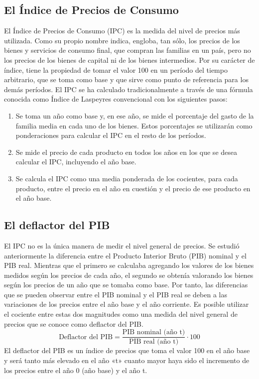 \documentclass[
]{krantz}
\providecommand{\tightlist}{%
  \setlength{\itemsep}{0pt}\setlength{\parskip}{0pt}}
\begin{document}
\hypertarget{el-uxedndice-de-precios-de-consumo}{%
\subsection{El Índice de Precios de Consumo}\label{el-uxedndice-de-precios-de-consumo}}

El Índice de Precios de Consumo (IPC) es la medida del nivel de precios más utilizada. Como su propio nombre indica, engloba, tan sólo, los precios de los bienes y servicios de consumo final, que compran las familias en un país, pero no los precios de los bienes de capital ni de los bienes intermedios. Por su carácter de índice, tiene la propiedad de tomar el valor 100 en un período del tiempo arbitrario, que se toma como base y que sirve como punto de referencia para los demás períodos. El IPC se ha calculado tradicionalmente a través de una fórmula conocida como Índice de Laspeyres convencional con los siguientes pasos:

\begin{enumerate}
\def\labelenumi{\arabic{enumi}.}
\tightlist
\item
  Se toma un año como base y, en ese año, se mide el porcentaje del gasto de la familia media en cada uno de los bienes. Estos porcentajes se utilizarán como ponderaciones para calcular el IPC en el resto de los períodos.
\item
  Se mide el precio de cada producto en todos los años en los que se desea calcular el IPC, incluyendo el año base.
\item
  Se calcula el IPC como una media ponderada de los cocientes, para cada producto, entre el precio en el año en cuestión y el precio de ese producto en el año base.
\end{enumerate}

\hypertarget{el-deflactor-del-pib}{%
\subsection{El deflactor del PIB}\label{el-deflactor-del-pib}}

El IPC no es la única manera de medir el nivel general de precios. Se estudió anteriormente la diferencia entre el Producto Interior Bruto (PIB) nominal y el PIB real. Mientras que el primero se calculaba agregando los valores de los bienes medidos según los precios de cada año, el segundo se obtenía valorando los bienes según los precios de un año que se tomaba como base. Por tanto, las diferencias que se pueden observar entre el PIB nominal y el PIB real se deben a las variaciones de los precios entre el año base y el año corriente. Es posible utilizar el cociente entre estas dos magnitudes como una medida del nivel general de precios que se conoce como deflactor del PIB.
\[\mathrm {\text{Deflactor del PIB} = \frac{\text{PIB nominal (año t)}}{\text{PIB real (año t)}}·100}\]
El deflactor del PIB es un índice de precios que toma el valor 100 en el año base y será tanto más elevado en el año «t» cuanto mayor haya sido el incremento de los precios entre el año 0 (año base) y el año t.
\end{document}
